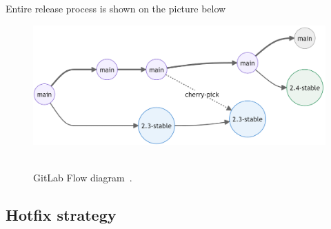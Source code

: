 Entire release process is shown on the picture below
\begin{figure}[H]
    \centering
    \includegraphics[width=1\textwidth]{../img/GitLab_Flow}
    ~\caption{GitLab Flow diagram~\cite{GitLabFlow}.}
\end{figure}

\subsection{Hotfix strategy}